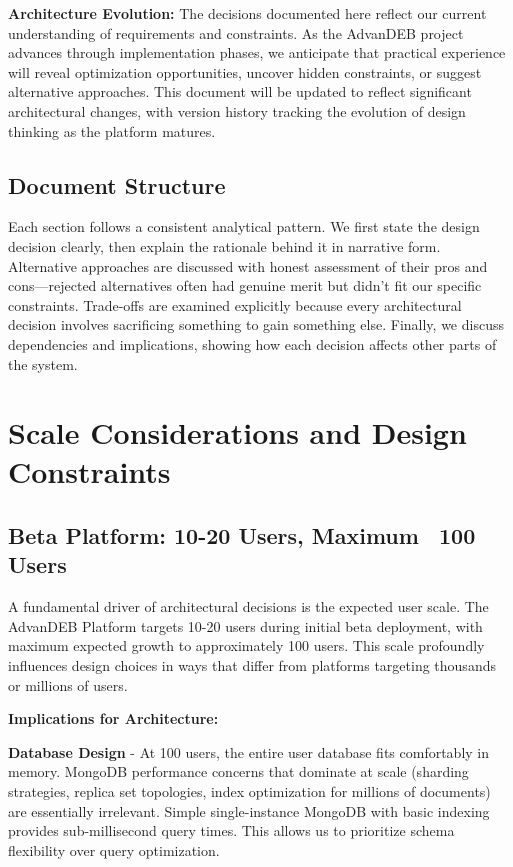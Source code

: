 \documentclass[12pt,a4paper]{article}
\begin{document}
\textbf{Architecture Evolution:} The decisions documented here reflect our current understanding of requirements and constraints. As the AdvanDEB project advances through implementation phases, we anticipate that practical experience will reveal optimization opportunities, uncover hidden constraints, or suggest alternative approaches. This document will be updated to reflect significant architectural changes, with version history tracking the evolution of design thinking as the platform matures.

\subsection{Document Structure}

Each section follows a consistent analytical pattern. We first state the design decision clearly, then explain the rationale behind it in narrative form. Alternative approaches are discussed with honest assessment of their pros and cons—rejected alternatives often had genuine merit but didn't fit our specific constraints. Trade-offs are examined explicitly because every architectural decision involves sacrificing something to gain something else. Finally, we discuss dependencies and implications, showing how each decision affects other parts of the system.

\section{Scale Considerations and Design Constraints}

\subsection{Beta Platform: 10-20 Users, Maximum ~100 Users}

A fundamental driver of architectural decisions is the expected user scale. The AdvanDEB Platform targets 10-20 users during initial beta deployment, with maximum expected growth to approximately 100 users. This scale profoundly influences design choices in ways that differ from platforms targeting thousands or millions of users.

\textbf{Implications for Architecture:}

\textbf{Database Design} - At 100 users, the entire user database fits comfortably in memory. MongoDB performance concerns that dominate at scale (sharding strategies, replica set topologies, index optimization for millions of documents) are essentially irrelevant. Simple single-instance MongoDB with basic indexing provides sub-millisecond query times. This allows us to prioritize schema flexibility over query optimization.
\end{document}
